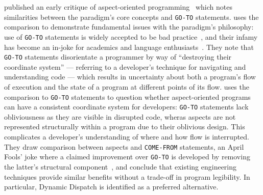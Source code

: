 \citeauthor{Constantinides04aopconsidered} published an early critique of
aspect-oriented programming~\cite{Constantinides04aopconsidered} which notes
similarities between the paradigm's core concepts and \lstinline{GO-TO}
statements. \citeauthor{Constantinides04aopconsidered} uses the comparison to
demonstrate fundamental issues with the paradigm's philosophy: use of
\lstinline{GO-TO} statements is widely accepted to be bad
practice~\cite{dijkstra1968letters}, and their infamy has become an in-joke for
academics and language enthusiasts~\cite{clark73comefrom}. They note that
\lstinline{GO-TO} statements disorientate a programmer by way of ``destroying
their coordinate system'' --- referring to a developer's technique for
navigating and understanding code --- which results in uncertainty about both a
program's flow of execution and the state of a program at different points of
its flow. \citeauthor{Constantinides04aopconsidered} uses the comparison to
\lstinline{GO-TO} statements to question whether aspect-oriented programs can
have a consistent coordinate system for developers: \lstinline{GO-TO} statements
lack obliviousness as they are visible in disrupted code, wheras aspects are not
represented structurally within a program due to their oblivious design. This
complicates a developer's understanding of where and how flow is interrupted.
They draw comparison between aspects and \lstinline{COME-FROM} statements, an
April Fools' joke where a claimed improvement over \lstinline{GO-TO} is
developed by removing the latter's structural component~\cite{clark73comefrom},
and conclude that existing engineering techniques provide similar benefits
without a trade-off in program legibility. In particular, Dynamic Dispatch is
identified as a preferred alternative.



